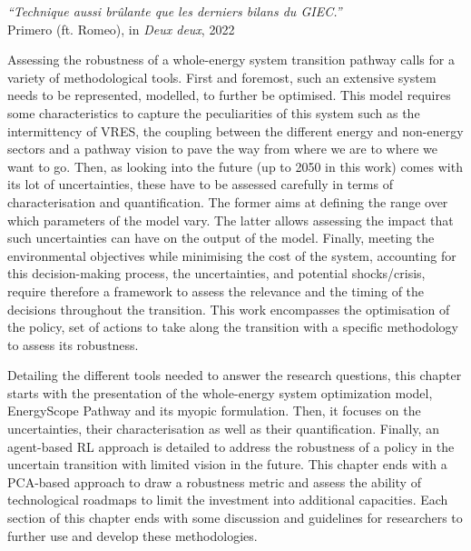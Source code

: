 \vspace{-0.2cm}
\begin{flushright}
\emph{``Technique aussi brûlante que les derniers bilans du GIEC.''}\\
 Primero (ft. Romeo), in \textit{Deux deux}, 2022
\end{flushright}
\vspace{0.4cm}
%
%
%

Assessing the robustness of a whole-energy system transition pathway calls for a variety of methodological tools. First and foremost, such an extensive system needs to be represented, \ie modelled, to further be optimised. This model requires some characteristics to capture the peculiarities of this system such as the intermittency of \gls{VRES}, the coupling between the different energy and non-energy sectors and a pathway vision to pave the way from where we are to where we want to go.  Then, as looking into the future (\ie up to 2050 in this work) comes with its lot of uncertainties, these have to be assessed carefully in terms of characterisation and quantification. The former aims at defining the range over which parameters of the model vary. The latter allows assessing the impact that such uncertainties can have on the output of the model. Finally, meeting the environmental objectives while minimising the cost of the system, accounting for this decision-making process, the uncertainties, and potential shocks/crisis, require therefore a framework to assess the relevance and the timing of the decisions throughout the transition. This work encompasses the optimisation of the policy, \ie set of actions to take along the transition with a specific methodology to assess its robustness. 

Detailing the different tools needed to answer the research questions, this chapter starts with the presentation of the whole-energy system optimization model, EnergyScope Pathway and its myopic formulation. Then, it focuses on the uncertainties, their characterisation as well as their quantification. Finally, an agent-based \acrfull{RL} approach is detailed to address the robustness of a policy in the uncertain transition with limited vision in the future. This chapter ends with a \gls{PCA}-based approach to draw a robustness metric and assess the ability of technological roadmaps to limit the investment into additional capacities. Each section of this chapter ends with some discussion and guidelines for researchers to further use and develop these methodologies.

